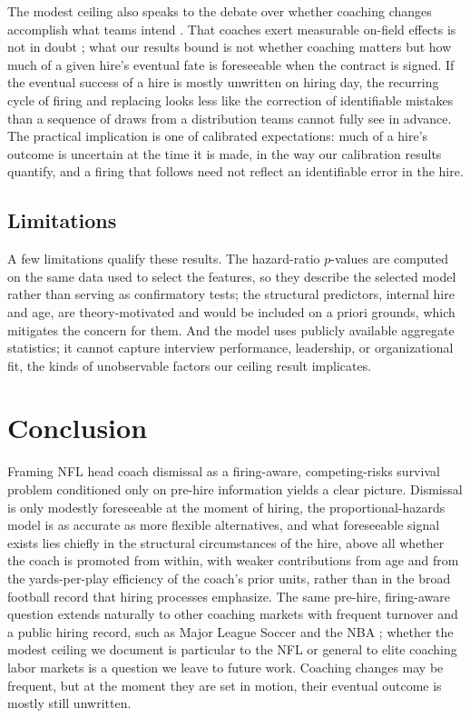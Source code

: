 \documentclass[USenglish]{article}
\theoremstyle{dgthm}
\theoremstyle{dgdef}
\begin{document}
The modest ceiling also speaks to the debate over whether coaching changes accomplish what teams intend \citep{bryson2024}. That coaches exert measurable on-field effects is not in doubt \citep{cannon2025}; what our results bound is not whether coaching matters but how much of a given hire's eventual fate is foreseeable when the contract is signed. If the eventual success of a hire is mostly unwritten on hiring day, the recurring cycle of firing and replacing looks less like the correction of identifiable mistakes than a sequence of draws from a distribution teams cannot fully see in advance. The practical implication is one of calibrated expectations: much of a hire's outcome is uncertain at the time it is made, in the way our calibration results quantify, and a firing that follows need not reflect an identifiable error in the hire.

\subsection{Limitations}

A few limitations qualify these results. The hazard-ratio $p$-values are computed on the same data used to select the features, so they describe the selected model rather than serving as confirmatory tests; the structural predictors, internal hire and age, are theory-motivated and would be included on a priori grounds, which mitigates the concern for them. And the model uses publicly available aggregate statistics; it cannot capture interview performance, leadership, or organizational fit, the kinds of unobservable factors our ceiling result implicates.

\section{Conclusion}

Framing NFL head coach dismissal as a firing-aware, competing-risks survival problem conditioned only on pre-hire information yields a clear picture. Dismissal is only modestly foreseeable at the moment of hiring, the proportional-hazards model is as accurate as more flexible alternatives, and what foreseeable signal exists lies chiefly in the structural circumstances of the hire, above all whether the coach is promoted from within, with weaker contributions from age and from the yards-per-play efficiency of the coach's prior units, rather than in the broad football record that hiring processes emphasize. The same pre-hire, firing-aware question extends naturally to other coaching markets with frequent turnover and a public hiring record, such as Major League Soccer and the NBA \citep{gilfix2020}; whether the modest ceiling we document is particular to the NFL or general to elite coaching labor markets is a question we leave to future work. Coaching changes may be frequent, but at the moment they are set in motion, their eventual outcome is mostly still unwritten.
\end{document}
